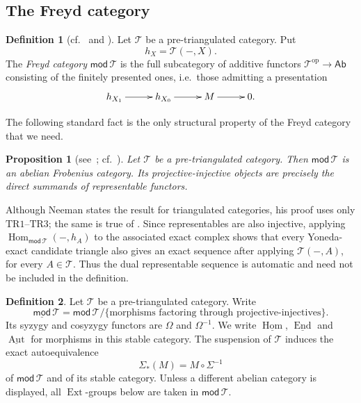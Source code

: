 \documentclass[a4paper,11pt,reqno]{amsart}
\newtheorem{proposition}[proposition]{Proposition}
\theoremstyle{definition}
\newtheorem{definition}[definition]{Definition}
\theoremstyle{plain}
\numberwithin{equation}{section}
\newcommand{\T}{\mathcal T}
\newcommand{\Hom}{\operatorname{Hom}}
\newcommand{\End}{\operatorname{End}}
\newcommand{\Ext}{\operatorname{Ext}}
\newcommand{\Aut}{\operatorname{Aut}}
\begin{document}
\subsection{The Freyd category}
\label{sec:freyd}

\begin{definition}[{\normalfont cf.~\cite{Freyd1966} and
\cite[Example~4.8]{Posur2021}}]
\label{not:freyd}
Let $\T$ be a pre-triangulated category.  Put
\[
 h_X=\T(-,X).
\]
The \emph{Freyd category} $\mathsf{mod}\,\T$ is the full subcategory of
additive functors $\T^{\mathrm{op}}\to\mathsf{Ab}$ consisting of the
finitely presented ones, i.e.\ those admitting a presentation
\begin{equation*}
\xymatrix@C=2.3pc{
 h_{X_1}\ar[r]&h_{X_0}\ar[r]&M\ar[r]&0.
}
\end{equation*}
\end{definition}

The following standard fact is the only structural property of the Freyd
category that we need.

\begin{proposition}[{\normalfont see~\cite[Proposition~2.5(b)]{GKO2013};
cf.~\cite[Proposition~5.1.10 and Corollary~5.1.23]{Neeman2001}}]
\label{prop:freyd-category}
Let $\T$ be a pre-triangulated category.  Then
$\mathsf{mod}\,\T$ is an abelian
Frobenius category.  Its projective-injective objects are precisely the
direct summands of representable functors.
\end{proposition}

Although Neeman states the result for triangulated categories, his proof
uses only $\mathrm{TR1}$--$\mathrm{TR3}$; the same is true of
\cite[Proposition~2.5(b)]{GKO2013}.  Since representables are also injective,
applying $\Hom_{\mathsf{mod}\,\T}(-,h_A)$ to the associated exact complex shows
that every Yoneda-exact candidate triangle also gives an exact sequence
after applying $\T(-,A)$, for every $A\in\T$.  Thus the dual representable
sequence is automatic and need not be included in the definition.

\begin{definition}
\label{not:stable-freyd}
Let $\T$ be a pre-triangulated category.  Write
\[
 \underline{\mathsf{mod}}\,\T
 =\mathsf{mod}\,\T/
 \{\text{morphisms factoring through projective-injectives}\}.
\]
Its syzygy and cosyzygy functors are
$\Omega$ and $\Omega^{-1}$.  We write $\underline{\Hom}$,
$\underline{\End}$ and $\underline{\Aut}$ for morphisms in this stable
category.  The suspension of $\T$ induces the exact autoequivalence
\[
 \Sigma_*(M)=M\circ\Sigma^{-1}
\]
of $\mathsf{mod}\,\T$ and of its stable category.  Unless a different
abelian category is displayed, all $\Ext$-groups below are taken in
$\mathsf{mod}\,\T$.
\end{definition}
\end{document}
